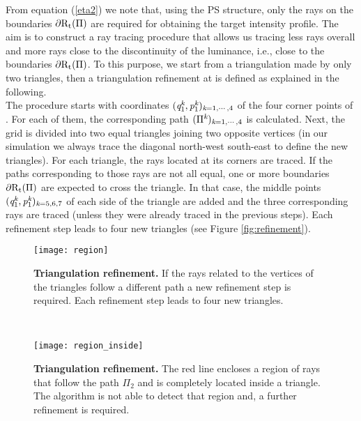 From equation (\ref{eta2}) we note that, using the PS structure, only the rays on the boundaries $\partial\mbox{$\textup{R}$}_\textrm{t}(\Pi)$ are required for obtaining the target intensity profile.
The aim is to construct a ray tracing procedure that allows us tracing less rays overall and more rays close to the discontinuity of the luminance, i.e., close to the boundaries $\partial\mbox{$\textup{R}$}_\textrm{t}(\Pi)$.
To this purpose, we start from a triangulation made by only two triangles, then a triangulation refinement at  is defined as explained in the following. \\ \indent
The procedure starts with coordinates $(\textit{q}_1^{\textit{k}},\textit{p}_1^{\textit{k}})_{\textit{k}=1, \cdots, 4}$ of the four corner points of . For each of them, the corresponding path $(\Pi^{\textit{k}})_{\textit{k}=1, \cdots, 4}$ is calculated. Next, the grid is divided into two equal triangles joining two opposite vertices (in our simulation we always trace the diagonal north-west south-east to define the new triangles). For each triangle, the rays located at its corners are traced. If the paths corresponding to
those rays are not all equal, one or more boundaries
$\partial\mbox{$\textup{R}$}_\textrm{t}(\Pi)$ are expected to cross the triangle.
In that case, the middle points $(\textit{q}_1^{\textit{k}},\textit{p}_1^{\textit{k}})_{\textit{k}=5,6,7}$ of each side of the triangle are added and
the three corresponding rays are traced (unless they were already traced in the previous steps). Each refinement step leads to four new triangles (see Figure \ref{fig:refinement}).
 \begin{figure}[h]
 \begin{minipage}[h]{\textwidth}
\centering
    \texttt{[image: region]}
  \caption{\textbf{Triangulation refinement.} If the rays related to the vertices of the triangles follow a different path a new refinement step is required.
   Each refinement step leads to four new triangles.}
  \label{fig:refinement}
\end{minipage}\\
\begin{minipage}[h]{\textwidth}
\centering
    \texttt{[image: region\_inside]}
  \caption{\textbf{Triangulation refinement.} The red line encloses a region of rays that follow the path $\Pi_2$ and is completely located inside a triangle.
  The algorithm is not able to detect that region and, a further refinement is required.}
   \label{fig:region inside}
\end{minipage}
  \end{figure} \\ \indent

